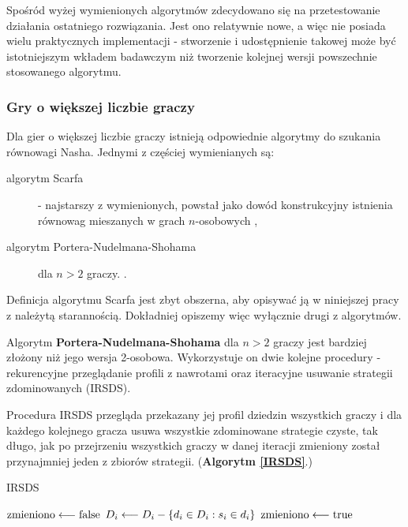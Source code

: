 \documentclass[polish]{standalone}
\begin{document}
Spośród wyżej wymienionych algorytmów zdecydowano się na przetestowanie działania ostatniego rozwiązania. Jest ono
relatywnie nowe, a więc nie posiada wielu praktycznych implementacji - stworzenie i udostępnienie takowej może być
istotniejszym wkładem badawczym niż tworzenie kolejnej wersji powszechnie stosowanego algorytmu.

\subsubsection{Gry o większej liczbie graczy}

Dla gier o większej liczbie graczy istnieją odpowiednie algorytmy do szukania równowagi Nasha. Jednymi z częściej
wymienianych są:
\begin{description}
\item[algorytm Scarfa] - najstarszy z wymienionych, powstał jako dowód konstrukcyjny istnienia równowag mieszanych
w grach $n$-osobowych \cite{SCARF-NR},
\item[algorytm Portera-Nudelmana-Shohama] dla $n > 2$ graczy. \cite{PNS-NE}.
\end{description}
Definicja algorytmu Scarfa jest zbyt obszerna, aby opisywać ją w niniejszej pracy z należytą starannością. Dokładniej
opiszemy więc wyłącznie drugi z algorytmów.

Algorytm \textbf{Portera-Nudelmana-Shohama}\cite{PNS-NE} dla $n > 2$ graczy jest bardziej złożony niż jego wersja
2-osobowa. Wykorzystuje on dwie kolejne procedury - rekurencyjne przeglądanie profili z nawrotami oraz iteracyjne usuwanie strategii zdominowanych
(IRSDS).

Procedura IRSDS przegląda przekazany jej profil dziedzin wszystkich graczy i dla każdego kolejnego gracza usuwa
wszystkie zdominowane strategie czyste, tak długo, jak po przejrzeniu wszystkich graczy w danej iteracji zmieniony 
został przynajmniej jeden z zbiorów strategii. (\textbf{Algorytm \ref{IRSDS}}.)

\begin{algorithm}
\caption{IRSDS}
\label{IRSDS}
\begin{algorithmic}
\REPEAT
 \STATE $\textrm{zmieniono} \longleftarrow \textrm{false}$
     \STATE $D_i \longleftarrow D_i - \{ d_i \in D_i: s_i \in d_i \}$
     \STATE $\textrm{zmieniono} \longleftarrow \textrm{true}$
     \ENDIF
    \ENDIF
   \ENDFOR 
  \ENDFOR
 \ENDFOR
{}
\end{algorithmic}
\end{algorithm}
\end{document}
